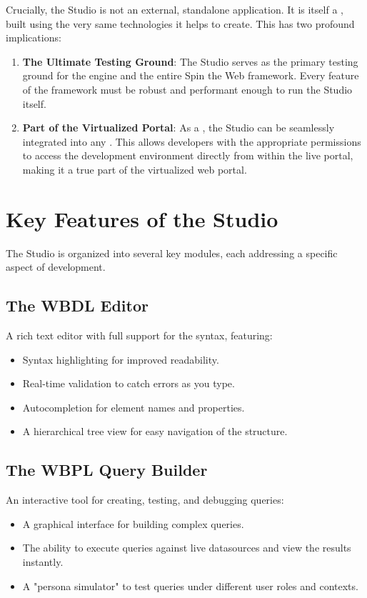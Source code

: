 Crucially, the Studio is not an external, standalone application. It is itself a \textbf{\webbaselet{}}, built using the very same technologies it helps to create. This has two profound implications:

\begin{enumerate}
    \item \textbf{The Ultimate Testing Ground}: The Studio serves as the primary testing ground for the \webspinner{} engine and the entire Spin the Web framework. Every feature of the framework must be robust and performant enough to run the Studio itself.
    \item \textbf{Part of the Virtualized Portal}: As a \webbaselet{}, the Studio can be seamlessly integrated into any \webbase{}. This allows developers with the appropriate permissions to access the development environment directly from within the live portal, making it a true part of the virtualized web portal.
\end{enumerate}

\section{Key Features of the Studio}
\label{sec:studio-features}

The Studio is organized into several key modules, each addressing a specific aspect of \webbase{} development.

\subsection{The WBDL Editor}
A rich text editor with full support for the \wbdl{} syntax, featuring:
\begin{itemize}
    \item Syntax highlighting for improved readability.
    \item Real-time validation to catch errors as you type.
    \item Autocompletion for element names and properties.
    \item A hierarchical tree view for easy navigation of the \webbase{} structure.
\end{itemize}

\subsection{The WBPL Query Builder}
An interactive tool for creating, testing, and debugging \wbpl{} queries:
\begin{itemize}
    \item A graphical interface for building complex queries.
    \item The ability to execute queries against live datasources and view the results instantly.
    \item A "persona simulator" to test queries under different user roles and contexts.
\end{itemize}

